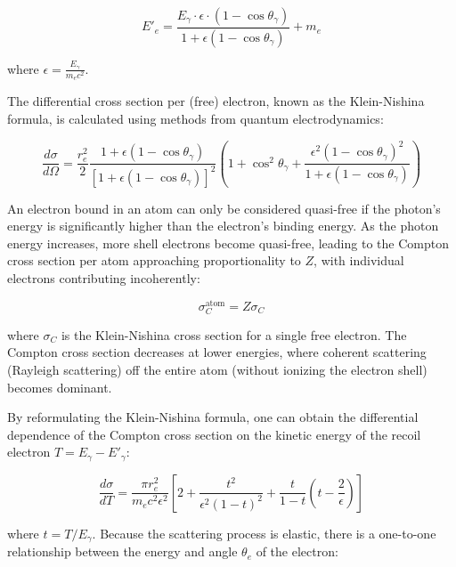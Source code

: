 \begin{equation}\label{diffeq}
E'_e = \frac{E_\gamma \cdot \epsilon \cdot (1 - \cos \theta_\gamma)}{1 + \epsilon (1 - \cos \theta_\gamma)}+m_e
\end{equation}

where $\epsilon = \frac{E_\gamma}{m_e c^2}$.

The differential cross section per (free) electron, known as the 
Klein-Nishina formula, is calculated using methods from quantum electrodynamics:

\begin{equation}\label{kleinnishina}
\frac{d\sigma}{d\Omega} = \frac{r_e^2}{2} \frac{1 + \epsilon (1 - \cos \theta_\gamma)}{[1 + \epsilon (1 - \cos \theta_\gamma)]^2} \left(1 + \cos^2 \theta_\gamma + \frac{\epsilon^2 (1 - \cos \theta_\gamma)^2}{1 + \epsilon (1 - \cos \theta_\gamma)} \right)
\end{equation}

An electron bound in an atom can only be considered quasi-free 
if the photon's energy is significantly higher than the electron's 
binding energy. As the photon energy increases, more shell electrons 
become quasi-free, leading to the Compton cross section per atom 
approaching proportionality to $Z$, with individual electrons 
contributing incoherently:

\begin{equation}
\sigma_C^{\text{atom}} = Z\sigma_C
\end{equation}

where $\sigma_C$ is the Klein-Nishina cross section for a 
single free electron. The Compton cross section decreases at 
lower energies, where coherent scattering (Rayleigh scattering) 
off the entire atom (without ionizing the electron shell) becomes dominant.

By reformulating the Klein-Nishina formula, one can obtain the 
differential dependence of the Compton cross section on the 
kinetic energy of the recoil electron $T = E_\gamma - E'_\gamma$:

\begin{equation}
\frac{d\sigma}{dT} = \frac{\pi r_e^2}{m_e c^2 \epsilon^2} \left[2 + \frac{t^2}{\epsilon^2 (1 - t)^2} + \frac{t}{1 - t}\left(t - \frac{2}{\epsilon}\right)\right]
\end{equation}

where $t = T/E_\gamma$. Because the scattering process is 
elastic, there is a one-to-one relationship between the 
energy and angle $\theta_e$ of the electron:

